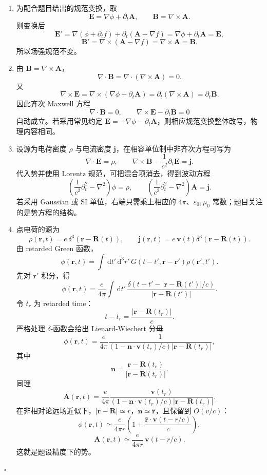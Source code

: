 \documentclass[UTF8,12pt]{ctexart}
\newcommand{\dd}{\,\mathrm d}
\newenvironment{solution}{%
  \par\medskip
  \noindent{\bfseries 解答}\quad\ignorespaces
}{\hfill$\square$\par\medskip}
\begin{document}
\begin{solution}
\begin{enumerate}[label=(\alph*)]
\item 为配合题目给出的规范变换，取
\[
\bm E=\nabla\phi+\partial_t\bm A,\qquad
\bm B=\nabla\times\bm A.
\]
则变换后
\[
\bm E'=\nabla(\phi+\partial_tf)+\partial_t(\bm A-\nabla f)
=\nabla\phi+\partial_t\bm A=\bm E,
\]
\[
\bm B'=\nabla\times(\bm A-\nabla f)
=\nabla\times\bm A=\bm B.
\]
所以场强规范不变。

\item 由 \(\bm B=\nabla\times\bm A\)，
\[
\nabla\cdot\bm B=\nabla\cdot(\nabla\times\bm A)=0.
\]
又
\[
\nabla\times\bm E
=\nabla\times(\nabla\phi+\partial_t\bm A)
=\partial_t(\nabla\times\bm A)
=\partial_t\bm B.
\]
因此齐次 Maxwell 方程
\[
\nabla\cdot\bm B=0,\qquad
\nabla\times\bm E-\partial_t\bm B=0
\]
自动成立。若采用常见约定 \(\bm E=-\nabla\phi-\partial_t\bm A\)，则相应规范变换整体改号，物理内容相同。

\item 设源为电荷密度 \(\rho\) 与电流密度 \(\bm j\)，在相容单位制中非齐次方程可写为
\[
\nabla\cdot\bm E=\rho,\qquad
\nabla\times\bm B-\frac1{c^2}\partial_t\bm E=\bm j.
\]
代入势并使用 Lorentz 规范，可把混合项消去，得到波动方程
\[
\left(\frac1{c^2}\partial_t^2-\nabla^2\right)\phi=\rho,
\qquad
\left(\frac1{c^2}\partial_t^2-\nabla^2\right)\bm A=\bm j.
\]
若采用 Gaussian 或 SI 单位，右端只需乘上相应的 \(4\pi\)、\(\varepsilon_0,\mu_0\) 常数；题目关注的是势方程的结构。

\item 点电荷的源为
\[
\rho(\bm r,t)=e\,\delta^3(\bm r-\bm R(t)),\qquad
\bm j(\bm r,t)=e\,\bm v(t)\delta^3(\bm r-\bm R(t)).
\]
由 retarded Green 函数，
\[
\phi(\bm r,t)
=\int\dd t'\dd^3r'\,
G(t-t',\bm r-\bm r')\rho(\bm r',t').
\]
先对 \(\bm r'\) 积分，得
\[
\phi(\bm r,t)
=\frac{e}{4\pi}
\int\dd t'\,
\frac{\delta\left(t-t'-|\bm r-\bm R(t')|/c\right)}
{|\bm r-\bm R(t')|}.
\]
令 \(t_r\) 为 retarded time：
\[
t-t_r=\frac{|\bm r-\bm R(t_r)|}{c}.
\]
严格处理 \(\delta\)-函数会给出 Lienard-Wiechert 分母
\[
\phi(\bm r,t)
=\frac{e}{4\pi}
\frac{1}{(1-\bm n\cdot\bm v(t_r)/c)|\bm r-\bm R(t_r)|},
\]
其中
\[
\bm n=\frac{\bm r-\bm R(t_r)}{|\bm r-\bm R(t_r)|}.
\]
同理
\[
\bm A(\bm r,t)
=\frac{e}{4\pi}
\frac{\bm v(t_r)}
{(1-\bm n\cdot\bm v(t_r)/c)|\bm r-\bm R(t_r)|}.
\]
在非相对论远场近似下，\(|\bm r-\bm R|\simeq r\)，\(\bm n\simeq \hat{\bm r}\)，且保留到 \(O(v/c)\)：
\[
\phi(\bm r,t)
\simeq \frac{e}{4\pi r}
\left(1+\frac{\hat{\bm r}\cdot\bm v(t-r/c)}{c}\right),
\]
\[
\bm A(\bm r,t)
\simeq \frac{e}{4\pi r}\,\bm v(t-r/c).
\]
这就是题设精度下的势。
\end{enumerate}
\end{solution}
\end{document}
